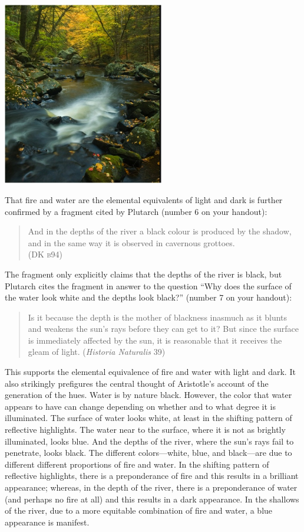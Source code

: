 \begin{frame}
	\begin{center}
		\includegraphics[height=8cm]{../../graphics/black_river.jpg}
	\end{center}
\end{frame}

That fire and water are the elemental equivalents of light and dark is further confirmed by a fragment cited by Plutarch (number 6 on your handout):
\begin{verse}
    And in the depths of the river a black colour is produced by the shadow,\\
    and in the same way it is observed in cavernous grottoes.\\
    (DK \textsc{b}94)
\end{verse}
The fragment only explicitly claims that the depths of the river is black, but Plutarch cites the fragment in answer to the question ``Why does the surface of the water look white and the depths look black?'' (number 7 on your handout):
\begin{quote}
    Is it because the depth is the mother of blackness inasmuch as it blunts and weakens the sun's rays before they can get to it? But since the surface is immediately affected by the sun, it is reasonable that it receives the gleam of light.  (\emph{Historia Naturalis} 39)
\end{quote}
This supports the elemental equivalence of fire and water with light and dark. It also strikingly prefigures the central thought of Aristotle's account of the generation of the hues. Water is by nature black. However, the color that water appears to have can change depending on whether and to what degree it is illuminated. The surface of water looks white, at least in the shifting pattern of reflective highlights. The water near to the surface, where it is not as brightly illuminated, looks blue. And the depths of the river, where the sun's rays fail to penetrate, looks black. The different colors---white, blue, and black---are due to different different proportions of fire and water. In the shifting pattern of reflective highlights, there is a preponderance of fire and this results in a brilliant appearance; whereas, in the depth of the river, there is a preponderance of water (and perhaps no fire at all) and this results in a dark appearance. In the shallows of the river, due to a more equitable combination of fire and water, a blue appearance is manifest.


